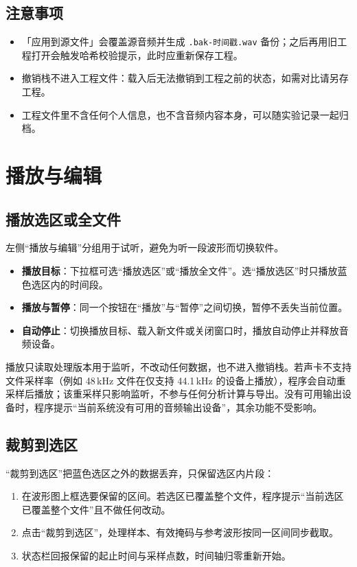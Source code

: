 \documentclass[UTF8,a4paper,12pt,scheme=chinese]{ctexart}
\begin{document}
\subsection{注意事项}

\begin{itemize}[leftmargin=2em]
  \item 「应用到源文件」会覆盖源音频并生成 \texttt{.bak-时间戳.wav} 备份；之后再用旧工程打开会触发哈希校验提示，此时应重新保存工程。
  \item 撤销栈不进入工程文件：载入后无法撤销到工程之前的状态，如需对比请另存工程。
  \item 工程文件里不含任何个人信息，也不含音频内容本身，可以随实验记录一起归档。
\end{itemize}

\section{播放与编辑}

\subsection{播放选区或全文件}

左侧“播放与编辑”分组用于试听，避免为听一段波形而切换软件。

\begin{itemize}
  \item \textbf{播放目标}：下拉框可选“播放选区”或“播放全文件”。选“播放选区”时只播放蓝色选区内的时间段。
  \item \textbf{播放与暂停}：同一个按钮在“播放”与“暂停”之间切换，暂停不丢失当前位置。
  \item \textbf{自动停止}：切换播放目标、载入新文件或关闭窗口时，播放自动停止并释放音频设备。
\end{itemize}

播放只读取处理版本用于监听，不改动任何数据，也不进入撤销栈。若声卡不支持文件采样率（例如 48\,kHz 文件在仅支持 44.1\,kHz 的设备上播放），程序会自动重采样后播放；该重采样只影响监听，不参与任何分析计算与导出。没有可用输出设备时，程序提示“当前系统没有可用的音频输出设备”，其余功能不受影响。

\subsection{裁剪到选区}

“裁剪到选区”把蓝色选区之外的数据丢弃，只保留选区内片段：

\begin{enumerate}
  \item 在波形图上框选要保留的区间。若选区已覆盖整个文件，程序提示“当前选区已覆盖整个文件”且不做任何改动。
  \item 点击“裁剪到选区”，处理样本、有效掩码与参考波形按同一区间同步截取。
  \item 状态栏回报保留的起止时间与采样点数，时间轴归零重新开始。
\end{enumerate}
\end{document}
